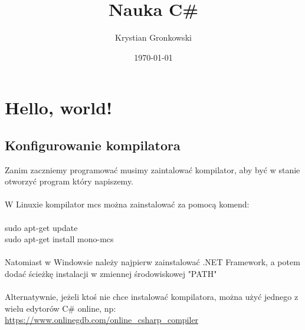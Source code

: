 \documentclass[a4paper]{article}
\title{Nauka C\#}
\author{Krystian Gronkowski}
\date{\today}
\theoremstyle{definition}
\begin{document}

\maketitle
\tableofcontents
	
\pagebreak
\section{Hello, world!}
\subsection{Konfigurowanie kompilatora}
Zanim zaczniemy programować musimy zaintalować kompilator, aby być w stanie otworzyć program który napiszemy.
\\\\W Linuxie kompilator mcs można zainstalować za pomocą komend:
\\\\sudo apt-get update
\\sudo apt-get install mono-mcs
\\\\Natomiast w Windowsie należy najpierw zainstalować .NET Framework, a potem dodać ścieżkę instalacji w zmiennej środowiskowej "PATH"
\\\\Alternatywnie, jeżeli ktoś nie chce instalować kompilatora, można użyć jednego z wielu edytorów C\# online, np: \url{https://www.onlinegdb.com/online_csharp_compiler}
\end{document}
